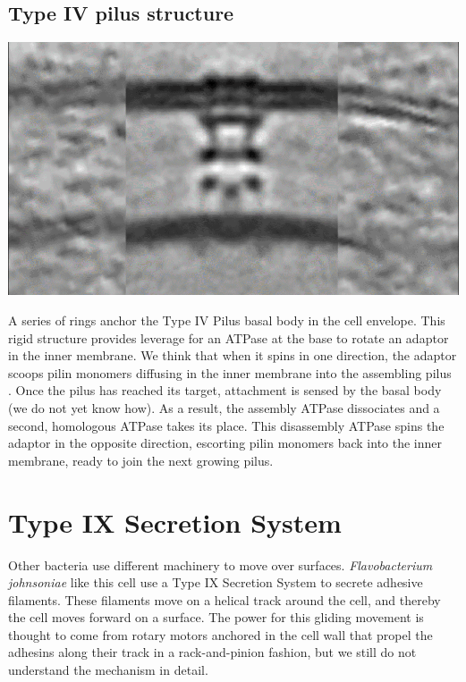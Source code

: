 \documentclass[]{tufte-book}
\begin{document}
\subsection{Type IV pilus structure}\label{Type_IV_pilus_structure}

\includegraphics{img/schematics/6_10_1}

A series of rings anchor the Type IV Pilus basal body in the cell
envelope. This rigid structure provides leverage for an ATPase at the
base to rotate an adaptor in the inner membrane. We think that when it
spins in one direction, the adaptor scoops pilin monomers diffusing in
the inner membrane into the assembling pilus \citep{chang2016}. Once the
pilus has reached its target, attachment is sensed by the basal body (we
do not yet know how). As a result, the assembly ATPase dissociates and a
second, homologous ATPase takes its place. This disassembly ATPase spins
the adaptor in the opposite direction, escorting pilin monomers back
into the inner membrane, ready to join the next growing pilus.

\section{Type IX Secretion System}\label{type-ix-secretion-system}

Other bacteria use different machinery to move over surfaces.
\emph{Flavobacterium johnsoniae} like this cell use a Type IX Secretion
System to secrete adhesive filaments. These filaments move on a helical
track around the cell, and thereby the cell moves forward on a surface.
The power for this gliding movement is thought to come from rotary
motors anchored in the cell wall that propel the adhesins along their
track in a rack-and-pinion fashion, but we still do not understand the
mechanism in detail.
\end{document}
